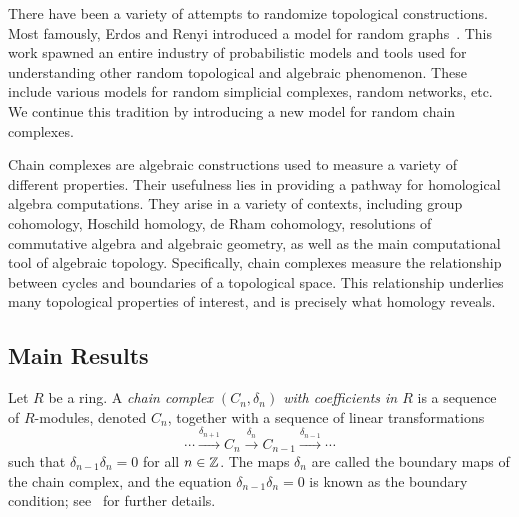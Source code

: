 There have been a variety of attempts to randomize topological
constructions. Most famously, Erdos and Renyi introduced a model
for random graphs~\cite{erdos_random_1959, erdos_evolution_1960}. 
This work spawned an entire industry of probabilistic
models and tools used for understanding other random topological
and algebraic phenomenon. These include various models for
random simplicial complexes, random networks, etc. We continue this tradition
by introducing a new model for random chain complexes.

Chain complexes are algebraic constructions used to measure a variety of 
different properties. Their usefulness lies in providing a pathway
for homological algebra computations. They arise in a variety of contexts,
including group cohomology, Hoschild homology, de Rham cohomology, 
resolutions of commutative algebra and algebraic geometry, as well
as the main computational tool of algebraic topology. Specifically,
chain complexes measure the relationship between cycles and boundaries
of a topological space. This relationship underlies many topological
properties of interest, and is precisely what homology reveals. 

%

\subsection*{Main Results}

Let $R$ be a ring. A {\em chain complex $(C_n, \delta_n)$ with coefficients in
$R$} is a sequence of $R$-modules, denoted $C_n$, together with a sequence of
linear transformations 
\[
  \cdots \xrightarrow{\delta_{n+1}} C_n \xrightarrow{\delta_n}
  C_{n-1} \xrightarrow{\delta_{n-1}} \cdots
\]
such that $\delta_{n-1}\delta_n = 0$ for all $n \in \mathbb{Z}$. The maps $\delta_n$
are called the boundary maps of the chain complex, and the equation
$\delta_{n-1} \delta_n = 0$ is known as the boundary condition;
see~\cite{hatcher2002algebraic} for further details.

